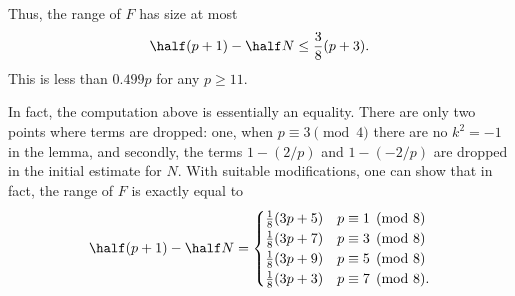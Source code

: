 Thus, the range of $F$ has size at most
\[ \half(p+1) - \half N \le \frac38(p+3). \]
This is less than $0.499p$ for any $p \ge 11$.

\begin{remark*}
  In fact, the computation above is essentially an equality.
  There are only two points where terms are dropped:
  one, when $p \equiv 3 \pmod 4$ there are no $k^2 = -1$ in the lemma,
  and secondly, the terms $1-\left( 2/p \right)$ and $1-\left( -2/p \right)$
  are dropped in the initial estimate for $N$.
  With suitable modifications, one can show that in fact,
  the range of $F$ is exactly equal to
  \[
    \half(p+1) - \half N =
    \begin{cases}
      \frac18(3p+5) & p \equiv 1 \pmod 8 \\
      \frac18(3p+7) & p \equiv 3 \pmod 8 \\
      \frac18(3p+9) & p \equiv 5 \pmod 8 \\
      \frac18(3p+3) & p \equiv 7 \pmod 8.
    \end{cases}
  \]
\end{remark*}
